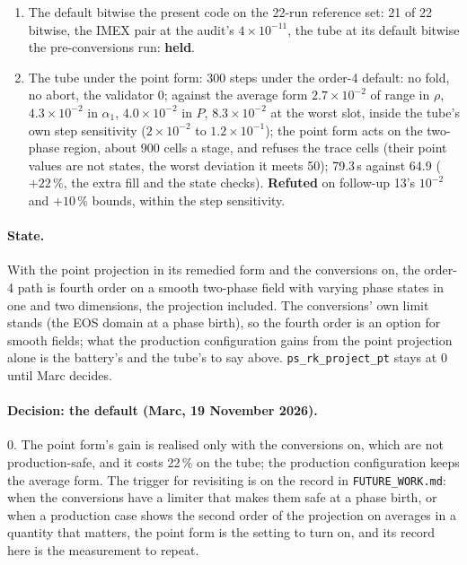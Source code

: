 \documentclass[11pt,a4paper]{article}
\newcommand{\code}[1]{\texttt{\small #1}}
\begin{document}
\begin{enumerate}[nosep]
      bound, one row much better and two a little worse; B10's
      threefold loss under the drift is gone.
\item The default bitwise the present code on the 22-run reference set:
      21 of 22 bitwise, the IMEX pair at the audit's
      $4\times10^{-11}$, the tube at its default bitwise the
      pre-conversions run: \textbf{held}.
\item The tube under the point form: 300 steps under the order-4 default: no fold, no abort, the
      validator 0; against the average form $2.7\times10^{-2}$ of range
      in $\rho$, $4.3\times10^{-2}$ in $\alpha_1$, $4.0\times10^{-2}$ in
      $P$, $8.3\times10^{-2}$ at the worst slot, inside the tube's own
      step sensitivity ($2\times10^{-2}$ to $1.2\times10^{-1}$); the
      point form acts on the two-phase region, about 900 cells a stage,
      and refuses the trace cells (their point values are not states,
      the worst deviation it meets 50); 79.3\,s against 64.9
      ($+22\,\%$, the extra fill and the state checks).  \textbf{Refuted}
      on follow-up 13's $10^{-2}$ and $+10\,\%$ bounds, within the
      step sensitivity.
\end{enumerate}

\paragraph{State.}  With the point projection in its remedied form and
the conversions on, the order-4 path is fourth order on a smooth
two-phase field with varying phase states in one and two dimensions,
the projection included.  The conversions' own limit stands (the EOS
domain at a phase birth), so the fourth order is an option for smooth
fields; what the production configuration gains from the point
projection alone is the battery's and the tube's to say above.
\code{ps\_rk\_project\_pt} stays at 0 until Marc decides.

\paragraph{Decision: the default (Marc, 19 November 2026).}  0.  The
point form's gain is realised only with the conversions on, which are
not production-safe, and it costs 22\,\% on the tube; the production
configuration keeps the average form.  The trigger for revisiting is on
the record in \code{FUTURE\_WORK.md}: when the conversions have a
limiter that makes them safe at a phase birth, or when a production
case shows the second order of the projection on averages in a quantity
that matters, the point form is the setting to turn on, and its record
here is the measurement to repeat.
\end{document}

